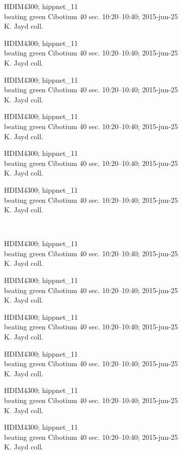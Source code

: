 \documentclass[2pt]{extarticle}
\begin{document}
\noindent
\parbox{0.16\textwidth}{\tiny \raggedright \rule[-0.3\baselineskip]{0pt}{10pt}HDIM4300; hippnet\_11\\ beating green Cibotium 40 sec. 10:20--10:40; 2015-jun-25\\ K. Jayd coll.}
\parbox{0.16\textwidth}{\tiny \raggedright \rule[-0.3\baselineskip]{0pt}{10pt}HDIM4300; hippnet\_11\\ beating green Cibotium 40 sec. 10:20--10:40; 2015-jun-25\\ K. Jayd coll.}
\parbox{0.16\textwidth}{\tiny \raggedright \rule[-0.3\baselineskip]{0pt}{10pt}HDIM4300; hippnet\_11\\ beating green Cibotium 40 sec. 10:20--10:40; 2015-jun-25\\ K. Jayd coll.}
\parbox{0.16\textwidth}{\tiny \raggedright \rule[-0.3\baselineskip]{0pt}{10pt}HDIM4300; hippnet\_11\\ beating green Cibotium 40 sec. 10:20--10:40; 2015-jun-25\\ K. Jayd coll.}
\parbox{0.16\textwidth}{\tiny \raggedright \rule[-0.3\baselineskip]{0pt}{10pt}HDIM4300; hippnet\_11\\ beating green Cibotium 40 sec. 10:20--10:40; 2015-jun-25\\ K. Jayd coll.}
\parbox{0.16\textwidth}{\tiny \raggedright \rule[-0.3\baselineskip]{0pt}{10pt}HDIM4300; hippnet\_11\\ beating green Cibotium 40 sec. 10:20--10:40; 2015-jun-25\\ K. Jayd coll.} \\ 
\vspace{0.001in} 

\noindent
\parbox{0.16\textwidth}{\tiny \raggedright \rule[-0.3\baselineskip]{0pt}{10pt}HDIM4300; hippnet\_11\\ beating green Cibotium 40 sec. 10:20--10:40; 2015-jun-25\\ K. Jayd coll.}
\parbox{0.16\textwidth}{\tiny \raggedright \rule[-0.3\baselineskip]{0pt}{10pt}HDIM4300; hippnet\_11\\ beating green Cibotium 40 sec. 10:20--10:40; 2015-jun-25\\ K. Jayd coll.}
\parbox{0.16\textwidth}{\tiny \raggedright \rule[-0.3\baselineskip]{0pt}{10pt}HDIM4300; hippnet\_11\\ beating green Cibotium 40 sec. 10:20--10:40; 2015-jun-25\\ K. Jayd coll.}
\parbox{0.16\textwidth}{\tiny \raggedright \rule[-0.3\baselineskip]{0pt}{10pt}HDIM4300; hippnet\_11\\ beating green Cibotium 40 sec. 10:20--10:40; 2015-jun-25\\ K. Jayd coll.}
\parbox{0.16\textwidth}{\tiny \raggedright \rule[-0.3\baselineskip]{0pt}{10pt}HDIM4300; hippnet\_11\\ beating green Cibotium 40 sec. 10:20--10:40; 2015-jun-25\\ K. Jayd coll.}
\parbox{0.16\textwidth}{\tiny \raggedright \rule[-0.3\baselineskip]{0pt}{10pt}HDIM4300; hippnet\_11\\ beating green Cibotium 40 sec. 10:20--10:40; 2015-jun-25\\ K. Jayd coll.} \\ 
\vspace{0.001in} 
\end{document}
